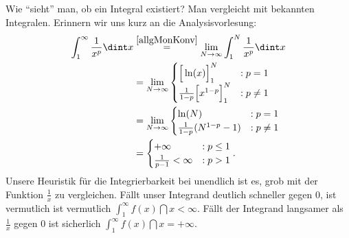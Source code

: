 \begin{bem}
	Wie \enquote{sieht} man, ob ein Integral existiert? Man vergleicht mit bekannten Integralen. Erinnern wir uns kurz an die Analysisvorlesung:
	\begin{align*}
		\int_{1}^{\infty} \frac{1}{x^p} \dint x &\overset{\ref{allgMonKonv}}{=} \lim\limits_{N \to \infty} \int_{1}^{N} \frac{1}{x^p} \dint x\\
		&= \lim\limits_{N \to \infty} \begin{cases}
		\Big[\ln(x)\Big]_1^N&:p = 1\\
		\frac{1}{1-p}\Big[x^{1-p}\Big]_1^N&:p \neq 1
		\end{cases}\\
		&= \lim\limits_{N \to \infty} \begin{cases}
		\ln(N)&:p = 1\\
		\frac{1}{1-p}(N^{1-p} - 1)&: p \neq 1
		\end{cases}\\
		&= \begin{cases}
		+\infty&:p \leq 1\\
		\frac{1}{p - 1} < \infty&:p > 1
		\end{cases}.
	\end{align*}
	Unsere Heuristik f\"ur die Integrierbarkeit bei unendlich ist es, grob mit der Funktion $\frac 1 x$ zu vergleichen. F\"allt unser Integrand deutlich schneller gegen $0$, ist vermutlich ist vermutlich $\int_{1}^{\infty} f(x) \dint x < \infty$. F\"allt der Integrand langsamer als $\frac 1 x$ gegen $0$ ist sicherlich $\int_{1}^{\infty} f(x) \dint x = + \infty$.\smallskip
	

\end{bem}
